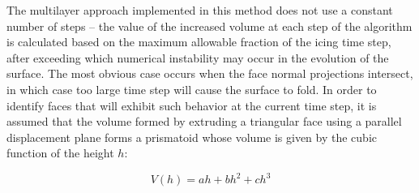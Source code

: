 \documentclass[
11pt,%
tightenlines,%
twoside,%
onecolumn,%
nofloats,%
nobibnotes,%
nofootinbib,%
superscriptaddress,%
noshowpacs,%
centertags]%
{revtex4-2}
\begin{document}
The multilayer approach implemented in this method does not use a constant number of steps -- the value of the increased volume at each step of the algorithm is calculated based on the maximum allowable fraction of the icing time step, after exceeding which numerical instability may occur in the evolution of the surface.
The most obvious case occurs when the face normal projections intersect, in which case too large time step will cause the surface to fold.
In order to identify faces that will exhibit such behavior at the current time step, it is assumed that the volume formed by extruding a triangular face using a parallel displacement plane forms a prismatoid whose volume is given by the cubic function of the height $h$:

\begin{equation}\label{Tong:1}
V(h)=ah+bh^2+ch^3
\end{equation}
\end{document}
